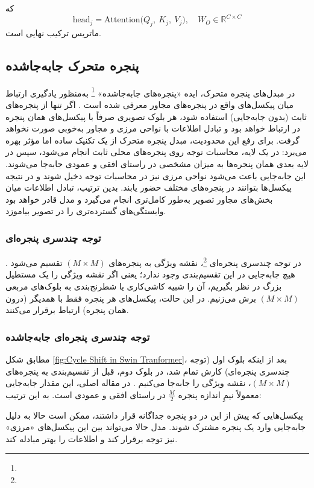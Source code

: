 که
\[
\text{head}_j = \mathrm{Attention}\bigl(Q_j,\ K_j,\ V_j\bigr),
\quad
W_O \in \mathbb{R}^{C \times C}
\]
ماتریس ترکیب نهایی است.

\subsection{پنجره متحرک جابه‌جاشده}
در مبدل‌های پنجره متحرک، ایده «پنجره‌های جابه‌جاشده» \footnote{} به‌منظور یادگیری ارتباط میان پیکسل‌های واقع در پنجره‌های مجاور معرفی شده است \cite{liu2021swintransformer}. اگر تنها از پنجره‌های ثابت (بدون جابه‌جایی) استفاده شود، هر بلوک تصویری صرفاً با پیکسل‌های همان پنجره در ارتباط خواهد بود و تبادل اطلاعات با نواحی مرزی و مجاور به‌خوبی صورت نخواهد گرفت. برای رفع این محدودیت، مبدل پنجره متحرک از یک تکنیک ساده اما مؤثر بهره می‌برد: در یک لایه، محاسبات توجه روی پنجره‌های محلی ثابت انجام می‌شود، سپس در لایه بعدی همان پنجره‌ها به میزان مشخصی در راستای افقی و عمودی جابه‌جا می‌شوند. این جابه‌جایی باعث می‌شود نواحی مرزی نیز در محاسبات توجه دخیل شوند و در نتیجه پیکسل‌ها بتوانند در پنجره‌های مختلف حضور یابند. بدین ترتیب، تبادل اطلاعات میان بخش‌های مجاور تصویر به‌طور کامل‌تری انجام می‌گیرد و مدل قادر خواهد بود وابستگی‌های گسترده‌تری را در تصویر بیاموزد.

\subsubsection{توجه چندسری پنجره‌ای}
در توجه چندسری پنجره‌ای \footnote{}، نقشه ویژگی به پنجره‌های \(\displaystyle (M \times M)\) تقسیم می‌شود \cite{liu2021swintransformer}.
هیچ جابه‌جایی در این تقسیم‌بندی وجود ندارد؛ یعنی اگر نقشه ویژگی را یک مستطیل بزرگ در نظر بگیریم،
آن را شبیه کاشی‌کاری یا شطرنج‌بندی به بلوک‌های مربعی \(\displaystyle (M \times M)\) برش می‌زنیم.
در این حالت، پیکسل‌های هر پنجره فقط با همدیگر (درون همان پنجره) ارتباط برقرار می‌کنند.

\subsubsection{توجه چندسری پنجره‌ای جابه‌جاشده}
مطابق شکل \ref{fig:Cycle Shift in Swin Tranformer}، بعد از اینکه بلوک اول (توجه چندسری پنجره‌ای) کارش تمام شد، در بلوک دوم، قبل از تقسیم‌بندی به پنجره‌های
\(\displaystyle (M \times M)\)، نقشه ویژگی را جابه‌جا می‌کنیم \cite{liu2021swintransformer}.
در مقاله اصلی، این مقدار جابه‌جایی معمولاً نیمِ اندازه پنجره
\(\displaystyle \frac{M}{2}\)
در راستای افقی و عمودی است. به این ترتیب:

پیکسل‌هایی که پیش از این در دو پنجره جداگانه قرار داشتند، ممکن است حالا به دلیل جابه‌جایی وارد یک پنجره مشترک شوند.
مدل حالا می‌تواند بین این پیکسل‌های «مرزی» نیز توجه برقرار کند و اطلاعات را بهتر مبادله کند.


